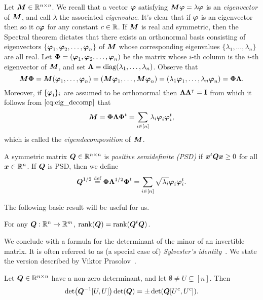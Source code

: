 Let ${\vb*{M}}\in\mathbb{R}^{n\times n}$. We recall that a vector $\vb*{\varphi}$ satisfying ${\vb*{M}}\vb*{\varphi}=\lambda\vb*{\varphi}$ is an \emph{eigenvector} of ${\vb*{M}}$, and call $\lambda$ the associated \emph{eigenvalue}. It's clear that if $\vb*{\varphi}$ is an eigenvector then so it $c\vb*{\varphi}$ for any constant $c\in \mathbb{R}$. If ${\vb*{M}}$ is real and symmetric, then the Spectral theorem dictates that there exists an orthonormal basis consisting of eigenvectors $\{\vb*{\varphi}_1,\vb*{\varphi}_2,\dots,\vb*{\varphi}_n\}$ of ${\vb*{M}}$ whose corresponding eigenvalues $\{\lambda_1,\dots,\lambda_n\}$ are all real. Let $\boldsymbol{\Phi}=(\vb*{\varphi}_1,\vb*{\varphi}_2,\dots,\vb*{\varphi}_n)$ be the matrix whose $i$-th column is the $i$-th eigenvector of ${\vb*{M}}$, and set $\vb{\Lambda}=\text{diag}(\lambda_1,\dots,\lambda_n)$. Observe that 
\begin{equation}
\label{eq:eig_decomp}
{\vb*{M}}\boldsymbol{\Phi}={\vb*{M}}(\vb*{\varphi}_1,\dots,\vb*{\varphi}_n)=({\vb*{M}}\vb*{\varphi}_1,\dots,{\vb*{M}}\vb*{\varphi}_n)=(\lambda_1\vb*{\varphi}_1,\dots,\lambda_n\vb*{\varphi}_n)=\boldsymbol{\Phi}\vb{\Lambda}.
\end{equation}
Moreover, if $\{\vb*{\varphi}_i\}_i$ are assumed to be orthonormal then $\vb{\Lambda}\vb{\Lambda}^\intercal=\vb{I}$ from which it follows from $\eqref{eq:eig_decomp}$ that \begin{equation}
    \label{eq:eig_decomp2}
    {\vb*{M}}=\boldsymbol{\Phi}\vb{\Lambda}\boldsymbol{\Phi}^t = \sum_{i\in[n]}\lambda_i\vb*{\varphi}_i\vb*{\varphi}_i^t,
\end{equation}
which is called the \emph{eigendecomposition} of ${\vb*{M}}$. 

A symmetric matrix $\vb*{Q}\in\mathbb{R}^{n\times n}$ is \emph{positive semidefinite (PSD)} if $\vb*{x}^t\vb*{Q}\vb*{x} \geq 0$ for all $\vb*{x}\in\mathbb{R}^n$. If $\vb*{Q}$ is PSD, then we define 
\begin{equation*}
    \vb*{Q}^{1/2} \overset{\text{def}}{=} \boldsymbol{\Phi}\vb{\Lambda}^{1/2}\boldsymbol{\Phi}^t = \sum_{i\in[n]}\sqrt{\lambda_i}\vb*{\varphi}_i\vb*{\varphi}_i^t.
\end{equation*}

The following basic result will be useful for us. 

\begin{lemma}
	\label{lem:rank(QtQ)}
	For any $\vb*{Q}:\mathbb{R}^n\to\mathbb{R}^m$, $\rank(\vb*{Q}) = \rank(\vb*{Q}^t\vb*{Q})$. 
\end{lemma}

We conclude with a formula for  the determinant of the minor of an invertible matrix.  It is often referred to as (a special  case of) \emph{Sylvester's identity}~\cite{sylvester1851xxxvii}. We state the version described by Viktor Prasolov~\cite{prasolov1994problems}. 

\begin{lemma}
	\label{lem:sylvester}
	Let $\vb*{Q}\in\mathbb{R}^{n\times n}$ have a non-zero determinant, and let $\emptyset\neq U\subsetneq[n]$. Then 
	\begin{equation}
	\label{eq:sylvester}
	\det(\vb*{Q}^{-1}[U,U]) \det(\vb*{Q}) = \pm \det(\vb*{Q}[U^c,U^c]). 
	\end{equation}
\end{lemma}



